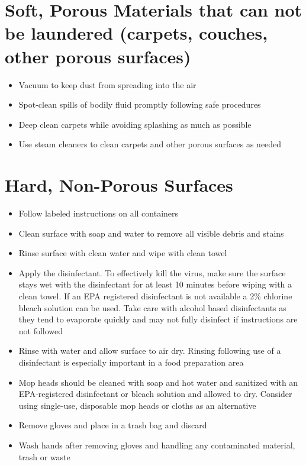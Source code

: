 \documentclass[onecolumn,journal]{IEEEtran}
\begin{document}
\begin{multicols}{2}
\section*{Soft, Porous Materials that can not be laundered (carpets, couches, other porous surfaces)}
\begin{itemize}
    \item Vacuum to keep dust from spreading into the air
    \item Spot-clean spills of bodily fluid promptly following safe procedures
    \item Deep clean carpets while avoiding splashing as much as possible
    \item Use steam cleaners to clean carpets and other porous surfaces as needed
\end{itemize}

\section*{Hard, Non-Porous Surfaces}
\begin{itemize}
    \item Follow labeled instructions on all containers
    \item Clean surface with soap and water to remove all visible debris and stains
    \item Rinse surface with clean water and wipe with clean towel
    \item Apply the disinfectant. To effectively kill the virus, make sure the surface stays wet with the disinfectant for at least 10 minutes before wiping with a clean towel. If an EPA registered disinfectant is not available a 2\% chlorine bleach solution can be used. Take care with alcohol based disinfectants as they tend to evaporate quickly and may not fully disinfect if instructions are not followed
    \item Rinse with water and allow surface to air dry. Rinsing following use of a disinfectant is especially important in a food preparation area
    \item Mop heads should be cleaned with soap and hot water and sanitized with an EPA-registered disinfectant or bleach solution and allowed to dry. Consider using single-use, disposable mop heads or cloths as an alternative
    \item Remove gloves and place in a trash bag and discard
    \item Wash hands after removing gloves and handling any contaminated material, trash or waste
\end{itemize}


\end{multicols}


% 
\end{document}
